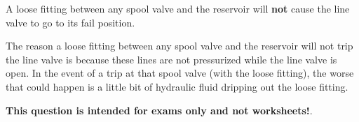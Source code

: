 A loose fitting between any spool valve and the reservoir will {\bf not} cause the line valve to go to its fail position.

\vskip 10pt

The reason a loose fitting between any spool valve and the reservoir will not trip the line valve is because these lines are not pressurized while the line valve is open.  In the event of a trip at that spool valve (with the loose fitting), the worse that could happen is a little bit of hydraulic fluid dripping out the loose fitting.







{\bf This question is intended for exams only and not worksheets!}.



